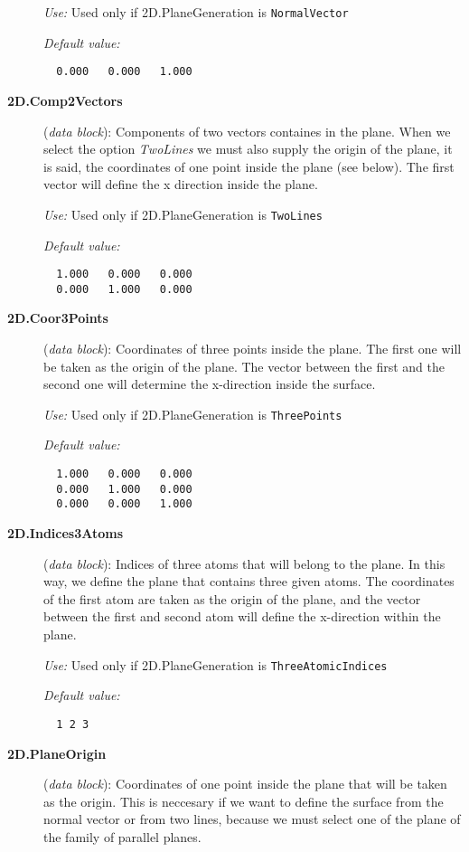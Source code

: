 \begin{description}
{\it Use:} Used only if 2D.PlaneGeneration is {\tt NormalVector}
    
{\it Default value:} 
\begin{verbatim}
  0.000   0.000   1.000
\end{verbatim}

\item[{\bf 2D.Comp2Vectors}] ({\it data block}): 
Components of two vectors containes in the plane. 
When we select the option {\it TwoLines} we must also supply the origin 
of the plane, it is said, the coordinates of one point inside the plane (see
below). The first vector will define the x direction inside the plane.

{\it Use:} Used only if 2D.PlaneGeneration is {\tt TwoLines}
    
{\it Default value:} 
\begin{verbatim}
  1.000   0.000   0.000
  0.000   1.000   0.000
\end{verbatim}

\item[{\bf 2D.Coor3Points}] ({\it data block}): 
Coordinates of three points inside the plane. The first one will be taken
as the origin of the plane. The vector between the first and the second one 
will determine the x-direction inside the surface.

{\it Use:} Used only if 2D.PlaneGeneration is {\tt ThreePoints}
    
{\it Default value:} 
\begin{verbatim}
  1.000   0.000   0.000
  0.000   1.000   0.000
  0.000   0.000   1.000
\end{verbatim}

\item[{\bf 2D.Indices3Atoms}] ({\it data block}): 
Indices of three atoms that will belong to the plane. In this way, we
define the plane that contains three given atoms. The coordinates
of the first atom are taken as the origin of the plane, 
and the vector between
the first and second atom will define the x-direction within
the plane.

{\it Use:} Used only if 2D.PlaneGeneration is {\tt ThreeAtomicIndices}
    
{\it Default value:} 
\begin{verbatim}
  1 2 3
\end{verbatim}

\item[{\bf 2D.PlaneOrigin}] ({\it data block}): 
Coordinates of one point inside the plane that will be taken as the origin. 
This is neccesary if we want to define the surface from the normal vector or
from two lines, because we must select one of the plane of the family of
parallel planes.


\end{description}
